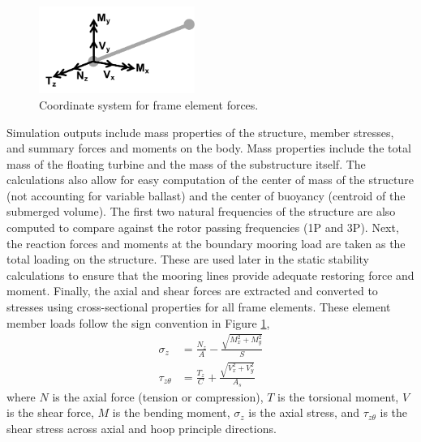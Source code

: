 \begin{figure}[htb]
  \begin{center}
    \includegraphics[width=2in]{figs/frameCS.pdf}
    \caption{Coordinate system for frame element forces.}
    \label{fig:frameCS}
  \end{center}
\end{figure}

Simulation outputs include mass properties of the structure, member
stresses, and summary forces and moments on the body.  Mass properties
include the total mass of the floating turbine and the mass of the
substructure itself.  The calculations also allow for easy computation
of the center of mass of the structure (not accounting for variable
ballast) and the center of buoyancy (centroid of the submerged volume).
The first two natural frequencies of the structure are also computed to
compare against the rotor passing frequencies (1P and 3P).  Next, the
reaction forces and moments at the boundary mooring load are taken as
the total loading on the structure.  These are used later in the static
stability calculations to ensure that the mooring lines provide adequate
restoring force and moment.  Finally, the axial and shear forces are
extracted and converted to stresses using cross-sectional properties for
all frame elements.  These element member loads follow the sign convention in
Figure \ref{fig:frameCS},
\begin{align*}
  \sigma_z &= \frac{N_z}{A} - \frac{\sqrt{M_x^2 + M_y^2}}{S}\\
  \tau_{z\theta} &= \frac{T_z}{C} + \frac{\sqrt{V_x^2 + V_y^2}}{A_s}
\end{align*}
where $N$ is the axial force (tension or compression), $T$ is the
torsional moment, $V$ is the shear force, $M$ is the bending moment,
$\sigma_z$ is the axial stress, and $\tau_{z\theta}$ is the shear
stress across axial and hoop principle directions.


